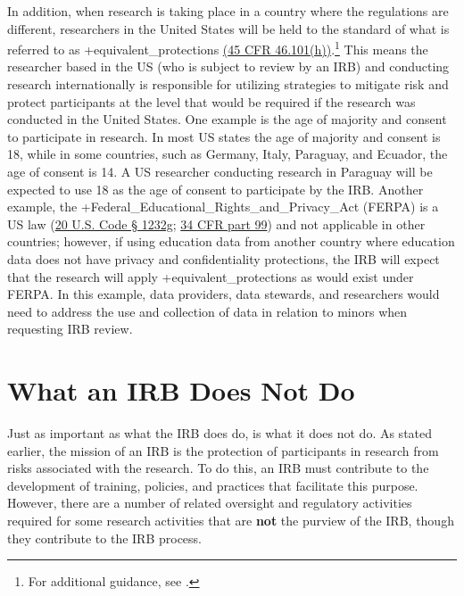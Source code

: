 \documentclass[
]{book}
\begin{document}
In addition, when research is taking place in a country where the regulations are different, researchers in the United States will be held to the standard of what is referred to as +equivalent\_protections\textbar{} \href{https://www.law.cornell.edu/cfr/text/45/46.101}{(45 CFR 46.101(h))}.\footnote{For additional guidance, see \citet{officeforhumanresearchprotections2016a}.} This means the researcher based in the US (who is subject to review by an IRB) and conducting research internationally is responsible for utilizing strategies to mitigate risk and protect participants at the level that would be required if the research was conducted in the United States. One example is the age of majority and consent to participate in research. In most US states the age of majority and consent is 18, while in some countries, such as Germany, Italy, Paraguay, and Ecuador, the age of consent is 14. A US researcher conducting research in Paraguay will be expected to use 18 as the age of consent to participate by the IRB. Another example, the +Federal\_Educational\_Rights\_and\_Privacy\_Act\textbar{} (FERPA) is a US law (\href{https://www.law.cornell.edu/uscode/text/20/1232g}{20 U.S. Code § 1232g}; \href{https://www.law.cornell.edu/cfr/text/34/part-99}{34 CFR part 99}) and not applicable in other countries; however, if using education data from another country where education data does not have privacy and confidentiality protections, the IRB will expect that the research will apply +equivalent\_protections\textbar{} as would exist under FERPA. In this example, data providers, data stewards, and researchers would need to address the use and collection of data in relation to minors when requesting IRB review.

\hypertarget{what-an-irb-does-not-do}{%
\section{What an IRB Does Not Do}\label{what-an-irb-does-not-do}}

Just as important as what the IRB does do, is what it does not do. As stated earlier, the mission of an IRB is the protection of participants in research from risks associated with the research. To do this, an IRB must contribute to the development of training, policies, and practices that facilitate this purpose. However, there are a number of related oversight and regulatory activities required for some research activities that are \textbf{not} the purview of the IRB, though they contribute to the IRB process.
\end{document}

